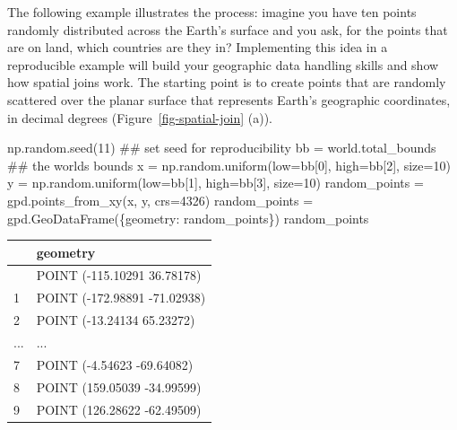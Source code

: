\documentclass[
  letterpaper,
]{krantz}
\newenvironment{Shaded}{\begin{snugshade}}{\end{snugshade}}
\newcommand{\CommentTok}[1]{\textcolor[rgb]{0.37,0.37,0.37}{#1}}
\newcommand{\DecValTok}[1]{\textcolor[rgb]{0.68,0.00,0.00}{#1}}
\newcommand{\NormalTok}[1]{\textcolor[rgb]{0.00,0.23,0.31}{#1}}
\newcommand{\OperatorTok}[1]{\textcolor[rgb]{0.37,0.37,0.37}{#1}}
\newcommand{\StringTok}[1]{\textcolor[rgb]{0.13,0.47,0.30}{#1}}
\begin{document}
The following example illustrates the process: imagine you have ten
points randomly distributed across the Earth's surface and you ask, for
the points that are on land, which countries are they in? Implementing
this idea in a reproducible example will build your geographic data
handling skills and show how spatial joins work. The starting point is
to create points that are randomly scattered over the planar surface
that represents Earth's geographic coordinates, in decimal degrees
(Figure~\ref{fig-spatial-join} (a)).

\begin{Shaded}
\begin{Highlighting}[]
\NormalTok{np.random.seed(}\DecValTok{11}\NormalTok{)       }\CommentTok{\#\# set seed for reproducibility}
\NormalTok{bb }\OperatorTok{=}\NormalTok{ world.total\_bounds  }\CommentTok{\#\# the world\textquotesingle{}s bounds}
\NormalTok{x }\OperatorTok{=}\NormalTok{ np.random.uniform(low}\OperatorTok{=}\NormalTok{bb[}\DecValTok{0}\NormalTok{], high}\OperatorTok{=}\NormalTok{bb[}\DecValTok{2}\NormalTok{], size}\OperatorTok{=}\DecValTok{10}\NormalTok{)}
\NormalTok{y }\OperatorTok{=}\NormalTok{ np.random.uniform(low}\OperatorTok{=}\NormalTok{bb[}\DecValTok{1}\NormalTok{], high}\OperatorTok{=}\NormalTok{bb[}\DecValTok{3}\NormalTok{], size}\OperatorTok{=}\DecValTok{10}\NormalTok{)}
\NormalTok{random\_points }\OperatorTok{=}\NormalTok{ gpd.points\_from\_xy(x, y, crs}\OperatorTok{=}\DecValTok{4326}\NormalTok{)}
\NormalTok{random\_points }\OperatorTok{=}\NormalTok{ gpd.GeoDataFrame(\{}\StringTok{\textquotesingle{}geometry\textquotesingle{}}\NormalTok{: random\_points\})}
\NormalTok{random\_points}
\end{Highlighting}
\end{Shaded}

\begin{longtable}[]{@{}ll@{}}
\toprule\noalign{}
& geometry \\
\midrule\noalign{}
\endhead
\bottomrule\noalign{}
\endlastfoot
0 & POINT (-115.10291 36.78178) \\
1 & POINT (-172.98891 -71.02938) \\
2 & POINT (-13.24134 65.23272) \\
... & ... \\
7 & POINT (-4.54623 -69.64082) \\
8 & POINT (159.05039 -34.99599) \\
9 & POINT (126.28622 -62.49509) \\
\end{longtable}
\end{document}
